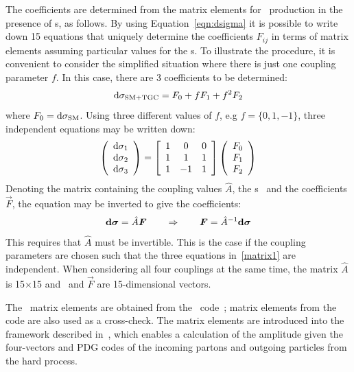 The coefficients are determined from the matrix elements for \ZZllll\
production in the presence of \TGC s, as follows. By using
Equation~\ref{eqn:dsigma} it is possible to write down 15 equations that
uniquely determine the coefficients $F_{ij}$ in terms of matrix elements
assuming particular values for the \TGC s.  To illustrate the procedure, it is
convenient to consider the simplified situation where there is just one coupling
parameter $f$.
In this case, there are 3 coefficients to be determined:
\begin{eqnarray}\label{revisit2}
{\rm d}\sigma_{\rm SM+TGC} = F_0 + fF_1 + f^2F_2 
\end{eqnarray}
where  $F_0={\rm d}\sigma_{\rm SM}$. Using three different values of $f$, e.g $f=\{0,1,-1\}$, three independent
equations may be written down:
\begin{eqnarray}\label{matrix1}
\left(\begin{array}{c}
{\rm d}\sigma_1\\
{\rm d}\sigma_2\\
{\rm d}\sigma_3
\end{array}\right) =
\left[\begin{array}{ccc}
1 & 0 & 0 \\
1 & 1 & 1 \\
1 & -1 & 1
\end{array}\right]
\left(\begin{array}{c}
F_0\\
F_1\\
F_2
\end{array}\right)
\end{eqnarray}
Denoting the matrix containing the coupling values $\hat{A}$, the \cx s
\dsigmavec\ and the coefficients $\vec{F}$, the equation may be
inverted to give the coefficients:
\begin{eqnarray}\label{matrix2} {\rm \bf d}\boldsymbol{\sigma}=\hat{A}\boldsymbol{F} \qquad \Rightarrow \qquad \boldsymbol{F}=\hat{A}^{-1}{\rm
\bf d}\boldsymbol{\sigma} 
\end{eqnarray} 
This requires that $\hat{A}$ must be invertible. This is the
case if the coupling parameters are chosen such that the three equations in~\ref{matrix1}
are independent. When considering all four couplings at the same time, the
matrix $\hat{A}$ is 15$\times$15 and \dsigmavec\ and $\vec{F}$ are
15-dimensional vectors.

The \TGC\ matrix elements are obtained from the \BR\ code~\cite{Baur:2000ae};
matrix elements from the \BHO~\cite{bho} code are also used as a cross-check. 
The matrix
elements are introduced into the  framework described in~\cite{Bella:2008wc},
which enables a calculation of the amplitude given the four-vectors and PDG
codes of the incoming partons and outgoing particles from the hard process. 

